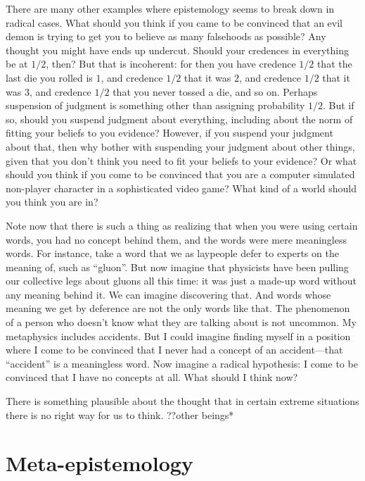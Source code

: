 There are many other examples where epistemology seems to break down in radical cases. What should you think if you came to be
convinced that an evil demon is trying to get you to believe as many falsehoods as possible? Any thought you might have ends
up undercut. Should your credences in everything be at $1/2$, then? But that is incoherent: for then you have credence $1/2$
that the last die you rolled is $1$, and credence $1/2$ that it was $2$, and credence $1/2$ that it was $3$, and credence $1/2$
that you never tossed a die, and so on. Perhaps suspension of judgment is something other than assigning probability $1/2$. But 
if so, should you suspend judgment about everything, including about the norm of fitting your beliefs to you evidence? However,
if you suspend your judgment about that, then why bother with suspending your judgment about other things, given that you don't 
think you need to fit your beliefs to your evidence? Or what should you think if you come to be convinced that you are a computer 
simulated non-player character in a sophisticated video game? What kind of a world should you think you are in? 

Note now that there is such a thing as realizing that when you were using certain words, you had no concept behind them, and
the words were mere meaningless words. For instance, take a word that we as laypeople defer to experts on the meaning of, such
as ``gluon''. But now imagine that physicists have been pulling our collective legs about gluons all this time: it was just a 
made-up word without any meaning behind it. We can imagine discovering that. And words whose meaning we get by deference are not
the only words like that. The phenomenon of a person who doesn't know what they are talking about is not uncommon. My metaphysics
includes accidents. But I could imagine finding myself in a position where I come to be convinced that I never had a concept of
an accident---that ``accident'' is a meaningless word. Now imagine a radical hypothesis: I come to be convinced that I have no
concepts at all. What should I think now? 

There is something plausible about the thought that in certain extreme situations there is no right way for us to think.
??other beings*

\section{Meta-epistemology}



